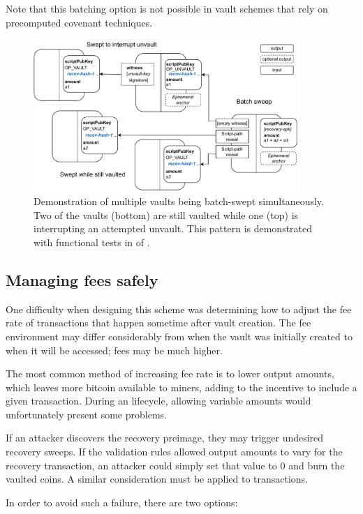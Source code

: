 \documentclass[10pt]{article}
\begin{document}
Note that this batching option is not possible in vault schemes that rely on
precomputed covenant techniques.

\begin{figure}[H]
\includegraphics[width=0.9\textwidth]{batch-sweep.pdf}
\centering
\caption{Demonstration of multiple vaults being batch-swept simultaneously. Two of
  the vaults (bottom) are still vaulted while one (top) is interrupting an attempted unvault.
  This pattern is demonstrated with functional tests in  of \cite{Tests}.
  }
\end{figure}

\subsection*{Managing fees safely}

One difficulty when designing this scheme was determining how to adjust the fee rate of
transactions that happen sometime after vault creation. The fee environment may differ
considerably from when the vault was initially created to when it will be accessed;
fees may be much higher. 

The most common method of increasing fee rate is to lower output
amounts, which leaves more bitcoin available to miners, adding to the
incentive to include a given transaction.
During an \opv{} lifecycle, allowing variable amounts would unfortunately
present some problems.

If an attacker discovers the recovery preimage, they may trigger undesired recovery
sweeps. If the \opv{} validation rules allowed output amounts to vary for the recovery
transaction, an attacker could simply set that value to 0 and burn the vaulted coins. 
A similar consideration must be applied to \opuv{} transactions.

In order to avoid such a failure, there are two options:
\end{document}
